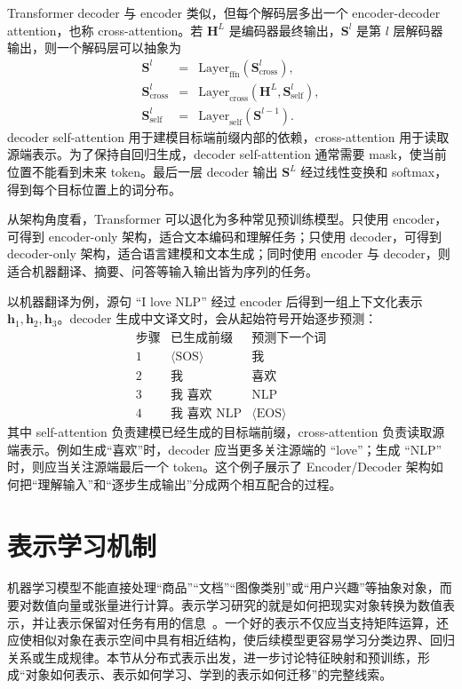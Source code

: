 Transformer decoder 与 encoder 类似，但每个解码层多出一个 encoder-decoder attention，也称 cross-attention。若 $\mathbf{H}^{L}$ 是编码器最终输出，$\mathbf{S}^{l}$ 是第 $l$ 层解码器输出，则一个解码层可以抽象为
\begin{eqnarray}
\mathbf{S}^{l}
& = &
\mathrm{Layer}_{\mathrm{ffn}}(\mathbf{S}_{\mathrm{cross}}^{l}),\\
\mathbf{S}_{\mathrm{cross}}^{l}
& = &
\mathrm{Layer}_{\mathrm{cross}}(\mathbf{H}^{L},\mathbf{S}_{\mathrm{self}}^{l}),\\
\mathbf{S}_{\mathrm{self}}^{l}
& = &
\mathrm{Layer}_{\mathrm{self}}(\mathbf{S}^{l-1}).
\end{eqnarray}
decoder self-attention 用于建模目标端前缀内部的依赖，cross-attention 用于读取源端表示。为了保持自回归生成，decoder self-attention 通常需要 mask，使当前位置不能看到未来 token。最后一层 decoder 输出 $\mathbf{S}^{L}$ 经过线性变换和 softmax，得到每个目标位置上的词分布。

从架构角度看，Transformer 可以退化为多种常见预训练模型。只使用 encoder，可得到 encoder-only 架构，适合文本编码和理解任务；只使用 decoder，可得到 decoder-only 架构，适合语言建模和文本生成；同时使用 encoder 与 decoder，则适合机器翻译、摘要、问答等输入输出皆为序列的任务。

以机器翻译为例，源句 ``I love NLP'' 经过 encoder 后得到一组上下文化表示 $\mathbf{h}_1,\mathbf{h}_2,\mathbf{h}_3$。decoder 生成中文译文时，会从起始符号开始逐步预测：
\[
\begin{array}{c|c|c}
\text{步骤} & \text{已生成前缀} & \text{预测下一个词}\\ \hline
1 & \langle \mathrm{SOS}\rangle & \text{我}\\
2 & \text{我} & \text{喜欢}\\
3 & \text{我 喜欢} & \text{NLP}\\
4 & \text{我 喜欢 NLP} & \langle \mathrm{EOS}\rangle
\end{array}
\]
其中 self-attention 负责建模已经生成的目标端前缀，cross-attention 负责读取源端表示。例如生成“喜欢”时，decoder 应当更多关注源端的 ``love''；生成 ``NLP'' 时，则应当关注源端最后一个 token。这个例子展示了 Encoder/Decoder 架构如何把“理解输入”和“逐步生成输出”分成两个相互配合的过程。

\section{表示学习机制}

机器学习模型不能直接处理“商品”“文档”“图像类别”或“用户兴趣”等抽象对象，而要对数值向量或张量进行计算。表示学习研究的就是如何把现实对象转换为数值表示，并让表示保留对任务有用的信息~\cite{BengioEtAl2013Representation}。一个好的表示不仅应当支持矩阵运算，还应使相似对象在表示空间中具有相近结构，使后续模型更容易学习分类边界、回归关系或生成规律。本节从分布式表示出发，进一步讨论特征映射和预训练，形成“对象如何表示、表示如何学习、学到的表示如何迁移”的完整线索。

